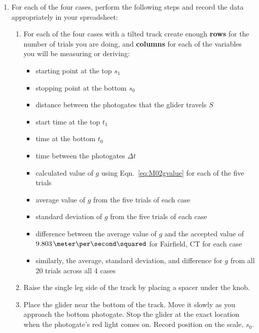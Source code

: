 \begin{enumerate}
\item For each of the four cases, perform the following steps and record the data appropriately in your spreadsheet:
  \begin{enumerate}
  \item For each of the four cases with a tilted track create enough \textbf{rows} for the number of trials you are doing, and \textbf{columns} for each of the variables you will be measuring or deriving:
    \begin{itemize}
      \item starting point at the top $s_1$
      \item stopping point at the bottom $s_0$
      \item distance between the photogates that the glider travels $S$
      \item start time at the top $t_1$
      \item time at the bottom $t_0$
      \item time between the photogates $\Delta t$
      \item calculated value of $g$ using Eqn.~\ref{eq:M02gvalue} for each of the five trials
      \item average value of $g$ from the five trials of each case
      \item standard deviation of $g$ from the five trials of each case
      \item difference between the average value of $g$ and the accepted value of $9.803\,\meter\per\second\squared$ for Fairfield, CT for each case
      \item similarly, the average, standard deviation, and difference for $g$ from all 20 trials across all 4 cases
      \end{itemize}
  \item Raise the single leg side of the track by placing a spacer under the knob.
  \item Place the glider near the bottom of the track. Move it slowly as you approach the bottom photogate. Stop the glider at the exact location when the photogate's red light comes on. Record position on the scale, $s_0$.

\end{enumerate}
\end{enumerate}
